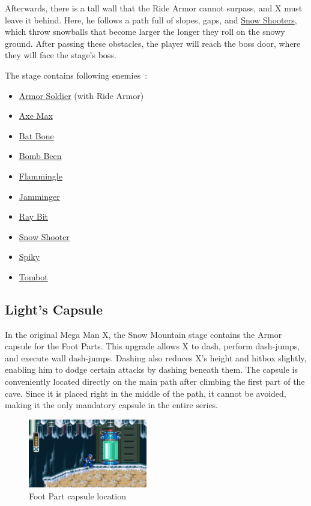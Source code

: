 Afterwards, there is a tall wall that the Ride Armor cannot surpass, and X must leave it behind. Here, he follows a path full of slopes, gaps, and \hyperlink{enem:Snow_Shooter}{Snow Shooters}, which throw snowballs that become larger the longer they roll on the snowy ground. After passing these obstacles, the player will reach the boss door, where they will face the stage's boss.

The stage contains following enemies~\cite{wiki:Snow_mountain}:
\begin{itemize}
	\item \hyperlink{enem:Armor_Soldier}{Armor Soldier} (with Ride Armor)
	\item \hyperlink{enem:Axe_Max}{Axe Max}
	\item \hyperlink{enem:Batton_Bone}{Bat Bone}
	\item \hyperlink{enem:Bomb_Been}{Bomb Been}
	\item \hyperlink{enem:Flammingle}{Flammingle}
	\item \hyperlink{enem:Jamminger}{Jamminger }
	\item \hyperlink{enem:Ray_Bit}{Ray Bit}
	\item \hyperlink{enem:Snow_Shooter}{Snow Shooter}
	\item \hyperlink{enem:Spiky}{Spiky}
	\item \hyperlink{enem:Tombot}{Tombot}
\end{itemize}

\subsection{Light's Capsule}\label{X:Foot_Parts}

In the original Mega Man X, the Snow Mountain stage contains the Armor capsule for the Foot Parts. This upgrade allows X to dash, perform dash-jumps, and execute wall dash-jumps. Dashing also reduces X's height and hitbox slightly, enabling him to dodge certain attacks by dashing beneath them. The capsule is conveniently located directly on the main path after climbing the first part of the cave. Since it is placed right in the middle of the path, it cannot be avoided, making it the only mandatory capsule in the entire series.
\begin{figure}[htp]
	\centering
	\includegraphics[height=3cm]{figures/X1/Chill_penguin/Armor_foot.jpg}
	\caption{Foot Part capsule location}
\end{figure}

